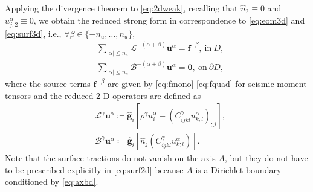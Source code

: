 \documentclass[extra]{gji}
\begin{document}
Applying the divergence theorem to \eqref{eq:2dweak}, recalling that 
$\hat{n}_{2}\equiv0$ and $u_{j,2}^\alpha \equiv 0$, we obtain the 
reduced strong form in correspondence to 
\eqref{eq:eom3d} and \eqref{eq:surf3d}, i.e.,
$\forall \beta\in \{-n_u,\dots,n_u\}$,
\begin{align}
  & \sum_{|\alpha|\le n_u}
  \mathscr{L}^{-\left(\alpha+\beta\right)}\mathbf{u}^\alpha=\mathbf{f}^{-\beta},
  \ \text{in}\ D,
  \label{eq:eom2d}\\[.5em]
  & \sum_{|\alpha|\le n_u}
  \mathscr{B}^{-\left(\alpha+\beta\right)}\mathbf{u}^\alpha=\mathbf{0},
  \ \text{on}\ \partial D,
  \label{eq:surf2d}
\end{align}
where the source terms $\mathbf{f}^{-\beta}$ are given by 
\eqref{eq:fmono}-\eqref{eq:fquad} for seismic moment tensors
and the reduced 2-D operators are defined as
\begin{align}
  & \mathscr{L}^{\gamma}\mathbf{u}^\alpha \coloneqq 
  \hat{\mathbf{g}}_i \left[
  \rho^\gamma \ddot{u}_i^\alpha-
  \left(C^\gamma_{ijkl} u_{k;l}^\alpha\right) _{;j}
  \right],
  \\[.5em]
  & \mathscr{B}^{\gamma}\mathbf{u}^\alpha \coloneqq 
  \hat{\mathbf{g}}_i \left[
  \hat{n}_j\left(C^\gamma_{ijkl} u_{k;l}^\alpha\right)
  \right].
\end{align}
Note that the surface tractions do not vanish on the axis $A$, but they do not  
have to be prescribed explicitly in \eqref{eq:surf2d} because $A$ is a Dirichlet 
boundary conditioned by \eqref{eq:axbd}.
\end{document}
